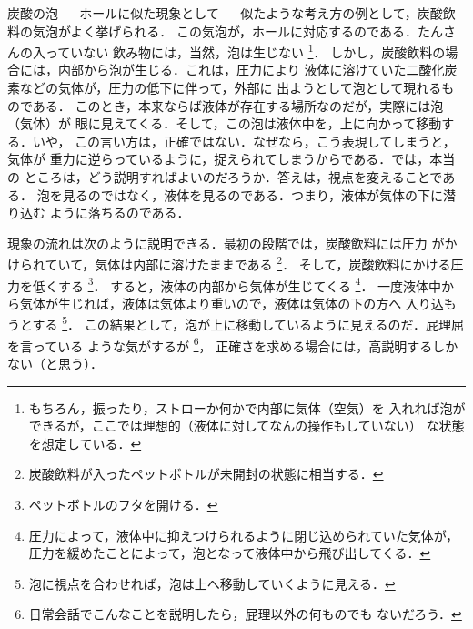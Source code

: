     \begin{memo}{炭酸の泡 --- ホールに似た現象として ---}
        似たような考え方の例として，炭酸飲料の気泡がよく挙げられる．
        この気泡が，ホールに対応するのである．たんさんの入っていない
        飲み物には，当然，泡は生じない
            \footnote{
                もちろん，振ったり，ストローか何かで内部に気体（空気）を
                入れれば泡ができるが，ここでは理想的（液体に対してなんの操作もしていない）
                な状態を想定している．
            }．
        しかし，炭酸飲料の場合には，内部から泡が生じる．これは，圧力により
        液体に溶けていた二酸化炭素などの気体が，圧力の低下に伴って，外部に
        出ようとして泡として現れるものである．
        このとき，本来ならば液体が存在する場所なのだが，実際には泡（気体）が
        眼に見えてくる．そして，この泡は液体中を，上に向かって移動する．いや，
        この言い方は，正確ではない．なぜなら，こう表現してしまうと，気体が
        重力に逆らっているように，捉えられてしまうからである．では，本当の
        ところは，どう説明すればよいのだろうか．答えは，視点を変えることである．
        泡を見るのではなく，液体を見るのである．つまり，液体が気体の下に潜り込む
        ように落ちるのである．

        現象の流れは次のように説明できる．最初の段階では，炭酸飲料には圧力
        がかけられていて，気体は内部に溶けたままである
            \footnote{
                炭酸飲料が入ったペットボトルが未開封の状態に相当する．
            }．
        そして，炭酸飲料にかける圧力を低くする
            \footnote{
                ペットボトルのフタを開ける．
            }．
        すると，液体の内部から気体が生じてくる
            \footnote{
                圧力によって，液体中に抑えつけられるように閉じ込められていた気体が，
                圧力を緩めたことによって，泡となって液体中から飛び出してくる．
            }．
        一度液体中から気体が生じれば，液体は気体より重いので，液体は気体の下の方へ
        入り込もうとする
            \footnote{
                泡に視点を合わせれば，泡は上へ移動していくように見える．
            }．
        この結果として，泡が上に移動しているように見えるのだ．屁理屈を言っている
        ような気がするが
            \footnote{
                日常会話でこんなことを説明したら，屁理以外の何ものでも
                ないだろう．
            }，
        正確さを求める場合には，高説明するしかない（と思う）．
    \end{memo}

